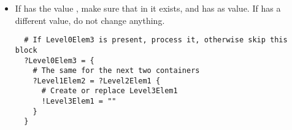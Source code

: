 \begin{itemize}
\item If  has the value , make sure
  that  in it exists, and has  as value. If
   has a different value, do not change anything.
\begin{verbatim}
  # If Level0Elem3 is present, process it, otherwise skip this block
  ?Level0Elem3 = {
    # The same for the next two containers
    ?Level1Elem2 = ?Level2Elem1 {
      # Create or replace Level3Elem1
      !Level3Elem1 = ""
    }
  }
\end{verbatim}
  
\end{itemize}


